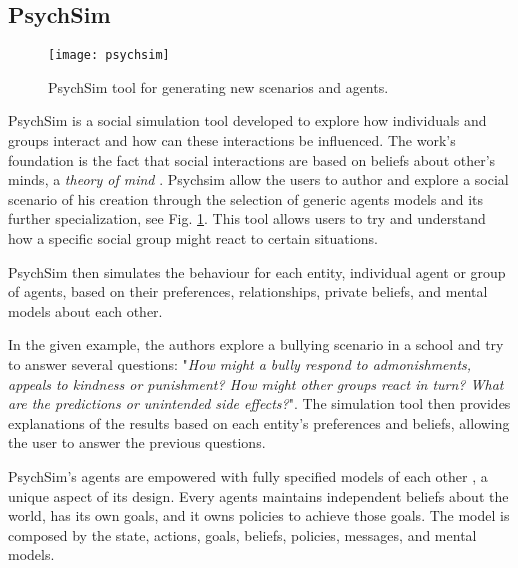 \subsection{PsychSim}
\label{ssec:psychsim}
\begin{figure}
  \centering
    \texttt{[image: psychsim]}
  \caption{PsychSim tool for generating new scenarios and agents.}
  \label{fig:psychsim}
\end{figure}
PsychSim \cite{marsella:psychsim} is a social simulation tool developed to explore how individuals and groups interact and how can these interactions be influenced.
The work's foundation is the fact that social interactions are based on beliefs about other's minds, a \textit{theory of mind} \cite{whiten:theoryofmind}.
Psychsim allow the users to author and explore a social scenario of his creation through the selection of generic agents models and its further specialization, see Fig. \ref{fig:psychsim}.
This tool allows users to try and understand how a specific social group might react to certain situations.

PsychSim then simulates the behaviour for each entity, individual agent or group of agents, based on their preferences, relationships, private beliefs, and mental models about each other.

In the given example, the authors explore a bullying scenario in a school and try to answer several questions:
"\textit{How might a bully respond to admonishments, appeals to kindness or punishment? 
How might other groups react in turn? 
What are the predictions or unintended side effects?}".
The simulation tool then provides explanations of the results based on each entity's preferences and beliefs, allowing the user to answer the previous questions.

PsychSim's agents are empowered with fully specified models of each other \cite{pynadath:modellingtheoryofmind}, a unique aspect of its design. Every agents maintains independent beliefs about the world, has its own goals, and it owns policies to achieve those goals. The model is composed by the state, actions, goals, beliefs, policies, messages, and mental models.

